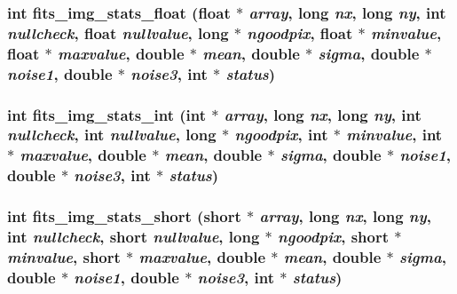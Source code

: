 \subsubsection{\setlength{\rightskip}{0pt plus 5cm}int fits\_\-img\_\-stats\_\-float (float $\ast$ {\em array}, long {\em nx}, long {\em ny}, int {\em nullcheck}, float {\em nullvalue}, long $\ast$ {\em ngoodpix}, float $\ast$ {\em minvalue}, float $\ast$ {\em maxvalue}, double $\ast$ {\em mean}, double $\ast$ {\em sigma}, double $\ast$ {\em noise1}, double $\ast$ {\em noise3}, int $\ast$ {\em status})}\label{test_2roimasker_2fitsio_8h_c543649b7428ec8840c8a9c6beac2cc9}


\subsubsection{\setlength{\rightskip}{0pt plus 5cm}int fits\_\-img\_\-stats\_\-int (int $\ast$ {\em array}, long {\em nx}, long {\em ny}, int {\em nullcheck}, int {\em nullvalue}, long $\ast$ {\em ngoodpix}, int $\ast$ {\em minvalue}, int $\ast$ {\em maxvalue}, double $\ast$ {\em mean}, double $\ast$ {\em sigma}, double $\ast$ {\em noise1}, double $\ast$ {\em noise3}, int $\ast$ {\em status})}\label{test_2roimasker_2fitsio_8h_75b334b5d2e8e4f22b80233208f8aaea}


\subsubsection{\setlength{\rightskip}{0pt plus 5cm}int fits\_\-img\_\-stats\_\-short (short $\ast$ {\em array}, long {\em nx}, long {\em ny}, int {\em nullcheck}, short {\em nullvalue}, long $\ast$ {\em ngoodpix}, short $\ast$ {\em minvalue}, short $\ast$ {\em maxvalue}, double $\ast$ {\em mean}, double $\ast$ {\em sigma}, double $\ast$ {\em noise1}, double $\ast$ {\em noise3}, int $\ast$ {\em status})}\label{test_2roimasker_2fitsio_8h_44abb1fc831a924cc5d60ebff4918525}


